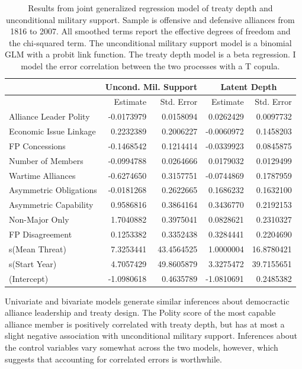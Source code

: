 \documentclass[12pt]{article}
\begin{document}
\begin{table}[ht]
\centering
\begin{tabular}{lrrrr}
  & \multicolumn{2}{c}{Uncond. Mil. Support} & \multicolumn{2}{c}{Latent Depth}\\ \hline
  & Estimate & Std. Error & Estimate & Std. Error \\ 
  \hline
  Alliance Leader Polity & -0.0173979 & 0.0158094 & 0.0262429 & 0.0097732 \\ 
  Economic Issue Linkage & 0.2232389 & 0.2006227 & -0.0060972 & 0.1458203 \\ 
  FP Concessions & -0.1468542 & 0.1214414 & -0.0339923 & 0.0845875 \\ 
  Number of Members & -0.0994788 & 0.0264666 & 0.0179032 & 0.0129499 \\ 
  Wartime Alliances & -0.6274650 & 0.3157751 & -0.0744869 & 0.1787959 \\ 
  Asymmetric Obligations & -0.0181268 & 0.2622665 & 0.1686232 & 0.1632100 \\ 
  Asymmetric Capability & 0.9586816 & 0.3864164 & 0.3436770 & 0.2192153 \\ 
  Non-Major Only & 1.7040882 & 0.3975041 & 0.0828621 & 0.2310327 \\ 
  FP Disagreement & 0.1253382 & 0.3352438 & 0.3284441 & 0.2204690 \\ 
  s(Mean Threat) & 7.3253441 & 43.4564525 & 1.0000004 & 16.8780421 \\ 
  s(Start Year) & 4.7057429 & 49.8605879 & 3.3275472 & 39.7155651 \\
  (Intercept) & -1.0980618 & 0.4635789 & -1.0810691 & 0.2485382 \\  
   \hline
\end{tabular}
\caption{Results from joint generalized regression model of treaty depth and unconditional military support. 
              Sample is offensive and defensive alliances from 1816 to 2007.
                     All smoothed terms report the effective degrees of freedom and the chi-squared term. 
                     The unconditional military support model is a binomial GLM with a probit link function. 
                     The treaty depth model is a beta regression. 
                     I model the error correlation between the two processes with a T copula.} 
\label{tab:gjrm-res}
\end{table} 


Univariate and bivariate models generate similar inferences about democractic alliance leadership and treaty design.
The Polity score of the most capable alliance member is positively correlated with treaty depth, but has at most a slight negative association with unconditional military support.
Inferences about the control variables vary somewhat across the two models, however, which suggests that accounting for correlated errors is worthwhile.   
\end{document}
